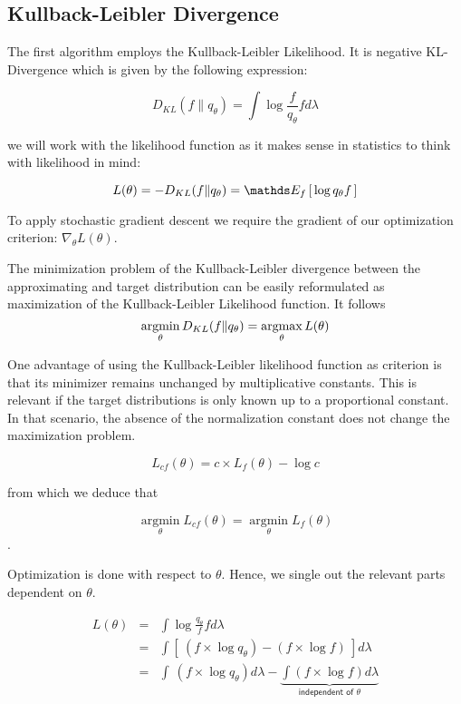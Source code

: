 \subsection{Kullback-Leibler Divergence}


The first algorithm employs the Kullback-Leibler Likelihood. It is negative KL-Divergence which is given by the following expression: 

$$D_{KL}(f\|q_\theta) = \displaystyle \int \log \frac{f}{q_{\theta}} f d\lambda$$

we will work with the likelihood function as it makes sense in statistics to think with likelihood in mind:

$$L(\theta) = - D_{KL}(f\|q_\theta) = \esperanceloi{f}{\log {q_\theta}{f}}$$

To apply stochastic gradient descent we require the gradient of our optimization criterion: $\nabla_\theta L(\theta)$.

The minimization problem of the Kullback-Leibler divergence between the approximating and target distribution can be easily reformulated as maximization of the Kullback-Leibler Likelihood function. It follows 
$$\argmin_\theta D_{KL}(f\|q_{\theta}) = \argmax_\theta L(\theta) $$

\bigskip
One advantage of using the Kullback-Leibler likelihood function as criterion is that its minimizer remains unchanged by multiplicative constants. This is relevant if the target distributions is only known up to a proportional constant. In that scenario, the absence of the normalization constant does not change the maximization problem.

$$L_{c f}(\theta) = c \times L_f(\theta) - \log c$$

from which we deduce that 

$$\operatorname{argmin}\limits_\theta L_{cf}(\theta) = \operatorname{argmin}\limits_\theta L_{f}(\theta)$$.

\bigskip

Optimization is done with respect to $\theta$. Hence, we single out the relevant parts dependent on $\theta$. 

$$
\begin{array}{lcl}
L(\theta) &=& \displaystyle \int \log \frac{q_\theta}{f} f d \lambda
\\
&=& \displaystyle\int\left[ \ \left(f \times \log q_\theta\right) - \left( f \times \log f \right) \ \right] d\lambda
\\
&=& \displaystyle\int \ \left(f \times \log q_\theta\right) d\lambda - \underbrace{\displaystyle\int \left( f \times \log f \right) d\lambda}_{\textsf{independent of } \theta}
\end{array}
$$

